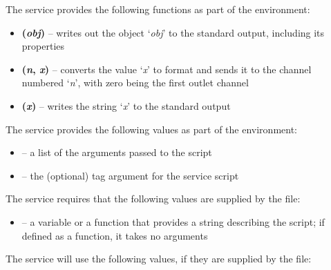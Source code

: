 \secondaryEnd{}
The \JSIO{} service provides the following functions as part of the \JS{} environment:
\begin{itemize}
\item \textbf{(\textit{obj})} -- writes out the object
`\textit{obj}' to the standard output, including its properties
\item \textbf{(\textit{n}, \textit{x})} -- converts the value
`\textit{x}' to \yarp{} format and sends it to the channel numbered `\textit{n}', with
zero being the first outlet channel
\item \textbf{(\textit{x})} -- writes the string `\textit{x}' to
the standard output
\end{itemize}
\secondaryEnd{}
The \JSIO{} service provides the following values as part of the \JS{} environment:
\begin{itemize}
\item \textbf{\openSq\closeSq} -- a list of the arguments passed to the
script
\item \textbf{} -- the (optional) tag argument for the service
script
\end{itemize}
\secondaryEnd{}
The \JSIO{} service requires that the following values are supplied by the \JS{} file:
\begin{itemize}
\item \textbf{} -- a variable or a function that provides a
string describing the script; if defined as a function, it takes no arguments
\end{itemize}
\secondaryEnd{}
The \JSIO{} service will use the following values, if they are supplied by the \JS{} file:
